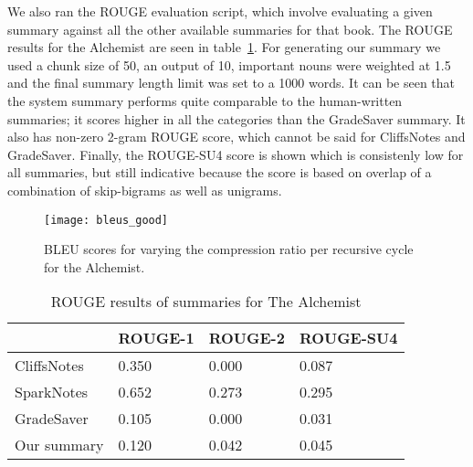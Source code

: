 We also ran the ROUGE evaluation script, which involve evaluating a given
summary against all the other available summaries for that book. The ROUGE
results for the Alchemist are seen in table~\ref{tab:rouge-alchemist}. For
generating our summary we used a chunk size of 50, an output of 10, important
nouns were weighted at 1.5 and the final summary length limit was set to a 1000
words. It can be seen that the system summary performs quite comparable to the
human-written summaries; it scores higher in all the categories than the
GradeSaver summary. It also has non-zero 2-gram ROUGE score, which cannot be
said for CliffsNotes and GradeSaver. Finally, the ROUGE-SU4 score is shown
which is consistenly low for all summaries, but still indicative because the
score is based on overlap of a combination of skip-bigrams as well as unigrams.

\begin{figure}[H]
	\centering
	\texttt{[image: bleus\_good]}
	\caption{BLEU scores for varying the compression ratio per recursive cycle for the Alchemist.}\label{fig:bleus}
\end{figure}

\begin{table}[H]
	\centering
	\caption{ROUGE results of summaries for The Alchemist}\label{tab:rouge-alchemist}
	\begin{tabular}{l l l l}
		\toprule
		\textbf{}   & \textbf{ROUGE-1} & \textbf{ROUGE-2} & \textbf{ROUGE-SU4} \\ \midrule
		CliffsNotes & 0.350           & 0.000           & 0.087 \\ \midrule
		SparkNotes  & 0.652           & 0.273           & 0.295 \\ \midrule
		GradeSaver  & 0.105           & 0.000           & 0.031 \\ \midrule
		Our summary & 0.120           & 0.042           & 0.045 \\
		\bottomrule
	\end{tabular}
\end{table}

